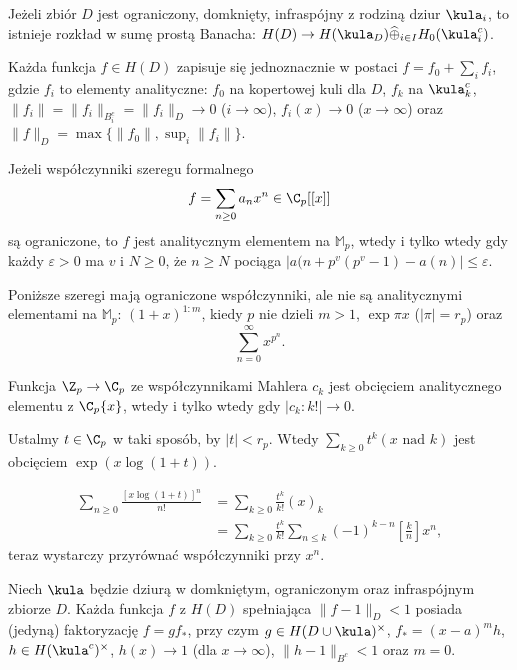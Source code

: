 \begin{twierdzenie}
	Jeżeli zbiór $D$ jest ograniczony, domknięty, infraspójny z rodziną dziur $\kula_i$, to istnieje rozkład w sumę prostą Banacha: $H(D) \to H(\kula_D) \widehat{\oplus}_{i \in I} H_0(\kula_i^c)$.

	Każda funkcja $f \in H(D)$ zapisuje się jednoznacznie w postaci $f = f_0 + \sum_i f_i$, gdzie $f_i$ to elementy analityczne: $f_0$ na kopertowej kuli dla $D$, $f_k$ na $\kula_k^c$, $\|f_i\| = \|f_i\|_{B^c_i} = \|f_i\|_D \to 0$ ($i \to \infty$), $f_i(x) \to 0$ ($x \to \infty$) oraz $\|f\|_D = \max\{\|f_0\|, \sup_i \|f_i\|\}$.
\end{twierdzenie}

\begin{twierdzenie}
	Jeżeli współczynniki szeregu formalnego 
	\[
		f = \sum_{n \ge 0} a_n x^n \in \C_p[[x]]
	\]
	są ograniczone, to $f$ jest analitycznym elementem na $\mathbb M_p$, wtedy i tylko wtedy gdy każdy $\varepsilon > 0$ ma $v$ i $N \ge 0$, że $n \ge N$ pociąga $|a(n+p^v(p^v-1) - a(n)| \le \varepsilon$.
\end{twierdzenie}

\begin{przyklad}
	Poniższe szeregi mają ograniczone współczynniki, ale nie są analitycznymi elementami na $\mathbb M_p$: $(1+x)^{1:m}$, kiedy $p$ nie dzieli $m > 1$, $\exp \pi x$ ($|\pi| = r_p$) oraz
	\[
		\sum_{n = 0}^\infty x^{p^n}.
	\]
\end{przyklad}

\begin{fakt}
	Funkcja $\Z_p \to \C_p$ ze współczynnikami Mahlera $c_k$ jest obcięciem analitycznego elementu z $\C_p\{x\}$, wtedy i tylko wtedy gdy $|c_k : k!| \to 0$.
\end{fakt}

\begin{przyklad}
	Ustalmy $t \in \C_p$ w taki sposób, by $|t| < r_p$.
	Wtedy $\sum_{k \ge 0} t^k (x \textrm{ nad } k)$ jest obcięciem $\exp (x \log (1+t))$.
\end{przyklad}

\begin{wniosek}[z przykładu]
	\begin{align*}
		\sum_{n \ge 0} \frac{[x \log(1+t)]^n}{n!} & = \sum_{k \ge 0} \frac {t^k}{k!}(x)_k \\
		& = \sum_{k \ge 0} \frac{t^k}{k!} \sum_{n \le k} (-1)^{k-n} \left[\frac k n\right] x^n,
	\end{align*}
	teraz wystarczy przyrównać współczynniki przy $x^n$.
\end{wniosek}

\begin{twierdzenie}[Motzkin]
	Niech $\kula$ będzie dziurą w domkniętym, ograniczonym oraz infraspójnym zbiorze $D$.
	Każda funkcja $f$ z $H(D)$ spełniająca $\|f - 1 \|_D < 1$ posiada (jedyną) faktoryzację $f = gf_*$, przy czym $g \in H(D \cup \kula)^\times$, $f_* = (x-a)^m h$, $h \in H(\kula^c)^\times$, $h(x) \to 1$ (dla $x \to \infty$), $\|h - 1\|_{B^c} < 1$ oraz $m = 0$.
\end{twierdzenie}
